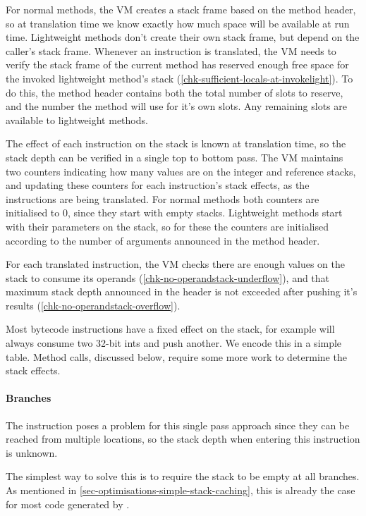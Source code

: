 For normal methods, the VM creates a stack frame based on the method header, so at translation time we know exactly how much space will be available at run time. Lightweight methods don't create their own stack frame, but depend on the caller's stack frame. Whenever an  instruction is translated, the VM needs to verify the stack frame of the current method has reserved enough free space for the invoked lightweight method's stack (\ref{chk-sufficient-locals-at-invokelight}). To do this, the method header contains both the total number of slots to reserve, and the number the method will use for it's own slots. Any remaining slots are available to lightweight methods.

The effect of each instruction on the stack is known at translation time, so the stack depth can be verified in a single top to bottom pass. The VM maintains two counters indicating how many values are on the integer and reference stacks, and updating these counters for each instruction's stack effects, as the instructions are being translated. For normal methods both counters are initialised to 0, since they start with empty stacks. Lightweight methods start with their parameters on the stack, so for these the counters are initialised according to the number of arguments announced in the method header.

For each translated instruction, the VM checks there are enough values on the stack to consume its operands (\ref{chk-no-operandstack-underflow}), and that maximum stack depth announced in the header is not exceeded after pushing it's results (\ref{chk-no-operandstack-overflow}).

Most bytecode instructions have a fixed effect on the stack, for example  will always consume two 32-bit ints and push another. We encode this in a simple table. Method calls, discussed below, require some more work to determine the stack effects. 

\paragraph{Branches}
The  instruction poses a problem for this single pass approach since they can be reached from multiple locations, so the stack depth when entering this instruction is unknown.

The simplest way to solve this is to require the stack to be empty at all branches. As mentioned in \ref{sec-optimisations-simple-stack-caching}, this is already the case for most code generated by .

